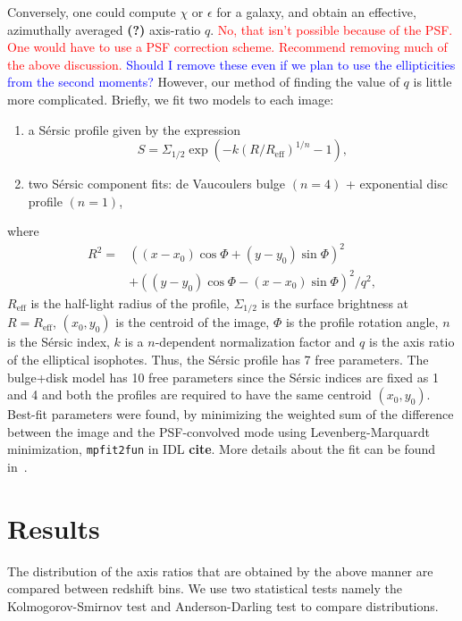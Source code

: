 \documentclass[twocolumn,useAMS,usenatbib]{mn2e}
\newcommand{\rachel}[1]{{\textcolor{red}{#1}}}
\newcommand{\arun}[1]{{\textcolor{blue}{#1}}}
\newcommand{\sersic}{S\'{e}rsic }
\begin{document}
Conversely, one could compute $\chi$ or $\epsilon$ for a galaxy, and obtain an effective, azimuthally averaged {\bf(?)} axis-ratio $q$. 
\rachel{No, that isn't possible because of the PSF.  One would have to
  use a PSF correction scheme.  Recommend removing much of the above discussion.}
\arun{Should I remove these even if we plan to use the ellipticities from the second moments?}  
However, our method of finding the value of $q$ is little more complicated. Briefly, we fit
two models to each image:
\begin{enumerate}
 \item a \sersic profile given by the expression 
       \begin{equation} 
    S = \Sigma_{1/2}\exp{\left( -k(R/R_{\text{eff}})^{1/n} -1 \right)},
       \end{equation}
       \item two \sersic component fits: de Vaucoulers bulge $(n=4)$ + exponential disc profile $(n=1)$,
\end{enumerate}
where \begin{align*} R^2 = & ((x-x_0)\cos\Phi+(y-y_0)\sin\Phi)^2  \\ & + ((y-y_0)\cos\Phi-(x-x_0)\sin\Phi)^2/q^2, \end{align*}
$R_{\text{eff}}$ is the half-light radius of the profile, $\Sigma_{1/2}$ is the surface brightness at $R=R_{\text{eff}}$, $(x_0,y_0)$ is the centroid of the image,
$\Phi$ is the profile rotation angle, $n$ is the \sersic index, $k$ is a $n$-dependent normalization factor and $q$ is the axis ratio of the elliptical isophotes.
Thus, the \sersic profile has 7 free parameters. The bulge+disk model has 10 free parameters since the \sersic indices are fixed as 1 and 4
and both the profiles are required to have the same centroid $(x_0,y_0)$. Best-fit parameters were found, by minimizing the weighted
sum of the difference between the image and the PSF-convolved mode using Levenberg-Marquardt minimization, \texttt{mpfit2fun} in IDL {\bf cite}. More details about the fit can be found in~\cite{Claire_Fits}.

\section{Results}
\label{S:results}
The distribution of the axis ratios that are obtained by the above manner are compared between redshift bins. We use two statistical tests namely the Kolmogorov-Smirnov test and Anderson-Darling test to compare distributions.
\end{document}
